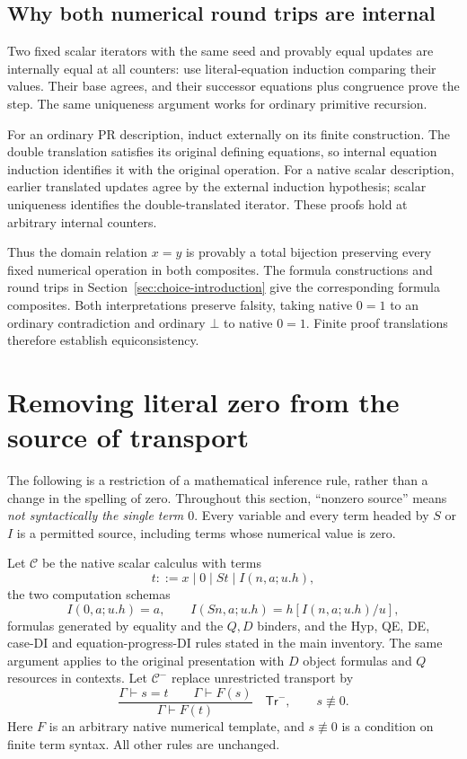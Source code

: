 \documentclass[11pt,letterpaper]{article}
\theoremstyle{definition}
\theoremstyle{remark}
\begin{document}
\subsection{Why both numerical round trips are internal}

Two fixed scalar iterators with the same seed and provably equal
updates are internally equal at all counters: use literal-equation
induction comparing their values. Their base agrees, and their
successor equations plus congruence prove the step. The same
uniqueness argument works for ordinary primitive recursion.

For an ordinary PR description, induct externally on its finite
construction. The double translation satisfies its original
defining equations, so internal equation induction identifies it
with the original operation. For a native scalar description,
earlier translated updates agree by the external induction
hypothesis; scalar uniqueness identifies the double-translated
iterator. These proofs hold at arbitrary internal counters.

Thus the domain relation $x=y$ is provably a total bijection
preserving every fixed numerical operation in both composites.
The formula constructions and round trips in
Section~\ref{sec:choice-introduction} give the corresponding formula
composites. Both interpretations preserve falsity, taking native
$0=1$ to an ordinary contradiction and ordinary $\bot$ to native
$0=1$. Finite proof translations therefore establish equiconsistency.

\section{Removing literal zero from the source of transport}
\label{zs:section}

The following is a restriction of a mathematical inference rule, rather
than a change in the spelling of zero. Throughout this section,
``nonzero source'' means \emph{not syntactically the single term $0$}.
Every variable and every term headed by $S$ or $I$ is a permitted source,
including terms whose numerical value is zero.

Let $\mathcal C$ be the native scalar calculus with terms
\[
 t::=x\mid0\mid St\mid I(n,a;u.h),
\]
the two computation schemas
\[
 I(0,a;u.h)=a,\qquad
 I(Sn,a;u.h)=h[I(n,a;u.h)/u],
\]
formulas generated by equality and the $Q,D$ binders, and the Hyp, QE,
DE, case-DI and equation-progress-DI rules stated in the main inventory.
The same argument applies to the original presentation with $D$ object
formulas and $Q$ resources in contexts. Let $\mathcal C^{-}$ replace
unrestricted transport by
\[
 \frac{\Gamma\vdash s=t\qquad\Gamma\vdash F(s)}
      {\Gamma\vdash F(t)}
 \quad\mathsf{Tr}^{-},\qquad s\not\equiv0.
 \tag{Tr$^-$}\label{zs:restricted-rule}
\]
Here $F$ is an arbitrary native numerical template, and $s\not\equiv0$
is a condition on finite term syntax. All other rules are unchanged.
\end{document}
